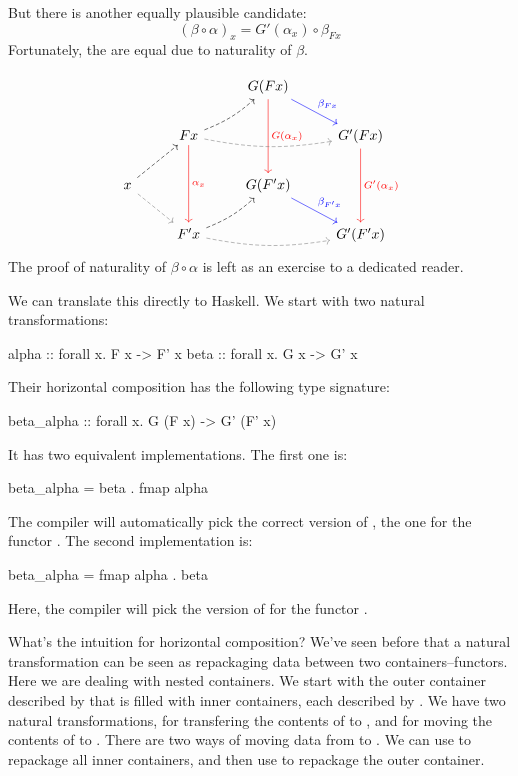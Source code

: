 \documentclass[DaoFP]{subfiles}
\begin{document}
But there is another equally plausible candidate: 
\[ (\beta \circ \alpha)_x = G'(\alpha_x) \circ \beta_{F x}\]
Fortunately, the are equal due to naturality of $\beta$. 

\[
 \begin{tikzcd}
  && G(F x)
  \arrow[dd, red, "G(\alpha_x)"]
  \arrow[dr, blue, "\beta_{F x}"]
  \\
  & F x
  \arrow[rr, bend right=10, dashed, gray]
  \arrow[ur, bend right=10, dashed]
  \arrow[dd, red, "\alpha_x"]
 && G' (F x)
  \arrow[dd, red, "G'(\alpha_x)"]
 \\
 x
 \arrow[ur, dashed]
 \arrow[dr, gray, dashed]
 && G(F' x)
  \arrow[dr, blue, "\beta_{F' x}"]
 \\
 &F' x
  \arrow[rr, bend right=10, dashed, gray]
 \arrow[ur, bend right=10, dashed]
 && G'(F' x)
\end{tikzcd}
\]
The proof of naturality of $\beta \circ \alpha$ is left as an exercise to a dedicated reader.

We can translate this directly to Haskell. We start with two natural transformations:
\begin{haskell}
alpha :: forall x. F x -> F' x
beta  :: forall x. G x -> G' x
\end{haskell}
Their horizontal composition has the following type signature:
\begin{haskell}
beta_alpha :: forall x. G (F x) -> G' (F' x)
\end{haskell}
It has two equivalent implementations. The first one is:
\begin{haskell}
beta_alpha = beta . fmap alpha
\end{haskell}
The compiler will automatically pick the correct version of , the one for the functor . The second implementation is:
\begin{haskell}
beta_alpha = fmap alpha . beta
\end{haskell}
Here, the compiler will pick the version of  for the functor .

What's the intuition for horizontal composition? We've seen before that a natural transformation can be seen as repackaging data between two containers--functors. Here we are dealing with nested containers. We start with the outer container described by  that is filled with inner containers, each described by . We have two natural transformations,  for transfering the contents of  to , and  for moving the contents of  to . There are two ways of moving data from  to . We can use  to repackage all inner containers, and then use  to repackage the outer container. 
\end{document}
